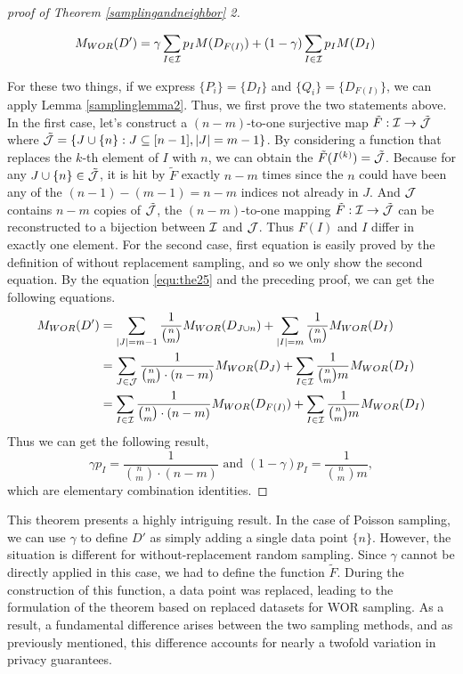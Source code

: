 \documentclass{article}
\begin{document}
\begin{proof}[proof of Theorem \ref{samplingandneighbor} 2]
\begin{enumerate}
\begin{align*}
        M_{WOR}(D') &= \gamma \sum_{I\in {\mathcal{I}}}p_I M(D_{F(I)}) + (1-\gamma) \sum_{I\in {\mathcal{I}}}p_I M(D_I)
    \end{align*}
\end{enumerate}
For these two things, if we express $\{P_i\} = \{D_I\}$ and $\{Q_i\} = \{D_{F(I)}\}$, we can apply Lemma \ref{samplinglemma2}. Thus, we first prove the two statements above. In the first case, let's construct a $(n-m)$-to-one surjective map $\tilde{F}: {\mathcal{I}} \to \tilde{{\mathcal{J}}}$ where $\tilde{{\mathcal{J}}} = \{ J \cup \{n\} : J \subseteq [n-1],|J| = m - 1 \}$. By considering a function that replaces the $k$-th element of $I$ with $n$, we can obtain the $\tilde{F}(I^{(k)}) = \tilde{{\mathcal{J}}}$. Because for any $J\cup \{n\} \in \tilde{{\mathcal{J}}}$, it is hit by $\tilde{F}$ exactly $n-m$ times since the $n$ could have been any of the $(n-1) - (m-1) =  n-m$ indices not already in $J$. And ${\mathcal{J}}$ contains $n-m$ copies of $\tilde{{\mathcal{J}}}$, the $(n-m)$-to-one mapping $\tilde{F}: {\mathcal{I}} \to \tilde{{\mathcal{J}}}$ can be reconstructed to a bijection between ${\mathcal{I}}$ and ${\mathcal{J}}$. Thus $F(I)$ and $I$ differ in exactly one element.
For the second case, first equation is easily proved by the definition of without replacement sampling, and so we only show the second equation. By the equation \ref{equ:the25} and the preceding proof, we can get the following equations.
\begin{align*}
    M_{WOR}(D') &= \sum_{|J|= m-1} \frac{1}{\binom{n}{m}}M_{WOR}(D_{J\cup {n}}) + \sum_{|I| = m} \frac{1}{\binom{n}{m}}M_{WOR}(D_I)\\
    &= \sum_{J \in {\mathcal{J}}} \frac{1}{\binom{n}{m} \cdot (n-m)}M_{WOR}(D_J) + \sum_{I \in {\mathcal{I}}}\frac{1}{\binom{n}{m}m} M_{WOR}(D_I) \\
    &= \sum_{I\in {\mathcal{I}}}\frac{1}{\binom{n}{m} \cdot (n-m)}M_{WOR}(D_{F(I)}) + \sum_{I \in {\mathcal{I}}}\frac{1}{\binom{n}{m}m} M_{WOR}(D_I)
\end{align*}
Thus we can get the following result,
\begin{equation*}
    \gamma p_I = \frac{1}{\binom{n}{m} \cdot (n-m)} \text{ and } (1- \gamma)p_I = \frac{1}{\binom{n}{m}m},
\end{equation*}
which are elementary combination identities.
\end{proof}

This theorem presents a highly intriguing result. In the case of Poisson sampling, we can use $\gamma$ to define $D'$ as simply adding a single data point $\{n\}$. However, the situation is different for without-replacement random sampling. Since $\gamma$ cannot be directly applied in this case, we had to define the function $\tilde{F}$. During the construction of this function, a data point was replaced, leading to the formulation of the theorem based on replaced datasets for WOR sampling. As a result, a fundamental difference arises between the two sampling methods, and as previously mentioned, this difference accounts for nearly a twofold variation in privacy guarantees.
\end{document}
